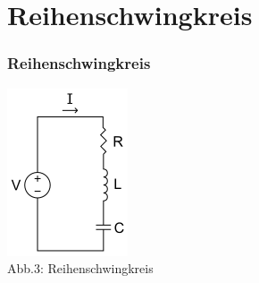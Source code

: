 \section*{Reihen\-schwing\-kreis}
\begin{frame}
\frametitle{Reihenschwingkreis}
\begin{center}
	\begin{minipage}{0.4\textwidth}
	\includegraphics[width=\textwidth,height=.5\textheight,keepaspectratio]{e07/Serirenschw.png}\\
	\tiny{Abb.3: Reihenschwingkreis \cite{wmen}}
	\end{minipage}
	\begin{minipage}{0.4\textwidth}

\end{minipage}
\end{center}
\end{frame}
